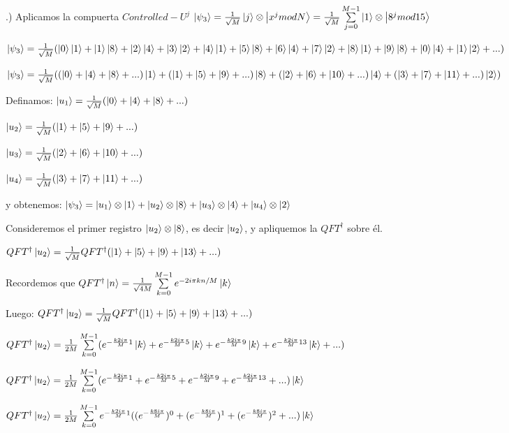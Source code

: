 \documentclass[11pt, spanish]{report}
\begin{document}
.) Aplicamos la compuerta $Controlled-U^j$ $\ket{\psi_3} = \frac{1}{\sqrt{M}} \ket{j} \otimes \ket{x^j mod N} = \frac{1}{\sqrt{M}} \sum\limits_{j=0}^{M-1} \ket{1} \otimes \ket{8^j mod 15}$

$\ket{\psi_3} = \frac{1}{\sqrt{M}} (\ket{0}\ket{1} + \ket{1}\ket{8} + \ket{2}\ket{4} + \ket{3}\ket{2} + \ket{4}\ket{1} + \ket{5}\ket{8} + \ket{6}\ket{4} + \ket{7}\ket{2} + \ket{8}\ket{1} + \ket{9}\ket{8} + \ket{0}\ket{4} + \ket{1}\ket{2} + ...)$

$\ket{\psi_3} = \frac{1}{\sqrt{M}} ((\ket{0} + \ket{4} + \ket{8} + ...)\ket{1} + (\ket{1} + \ket{5} + \ket{9} + ...) \ket{8} + (\ket{2} + \ket{6} + \ket{10} + ...) \ket{4} + (\ket{3} + \ket{7} + \ket{11} + ...) \ket{2})$

Definamos: $\ket{u_1} = \frac{1}{\sqrt{M}} (\ket{0} + \ket{4} + \ket{8} + ...)$

$\ket{u_2} = \frac{1}{\sqrt{M}} (\ket{1} + \ket{5} + \ket{9} + ...)$

$\ket{u_3} = \frac{1}{\sqrt{M}} (\ket{2} + \ket{6} + \ket{10} + ...)$

$\ket{u_4} = \frac{1}{\sqrt{M}} (\ket{3} + \ket{7} + \ket{11} + ...)$

y obtenemos: $\ket{\psi_3} = \ket{u_1} \otimes \ket{1} + \ket{u_2} \otimes \ket{8} + \ket{u_3} \otimes \ket{4} + \ket{u_4} \otimes \ket{2}$

Consideremos el primer registro $\ket{u_2} \otimes \ket{8}$, es decir $\ket{u_2}$, y apliquemos la $QFT^\dagger$ sobre él.

$QFT^\dagger \ket{u_2} = \frac{1}{\sqrt{M}} QFT^\dagger (\ket{1} + \ket{5} + \ket{9} + \ket{13} + ...)$

Recordemos que $QFT^\dagger \ket{n} = \frac{1}{\sqrt{4 M}} \sum\limits_{k=0}^{M-1} e^{-2 i \pi k n /M} \ket{k}$

Luego: $QFT^\dagger \ket{u_2} = \frac{1}{\sqrt{M}} QFT^\dagger (\ket{1} + \ket{5} + \ket{9} + \ket{13} + ...)$

$QFT^\dagger \ket{u_2} = \frac{1}{2M} \sum\limits_{k=0}^{M-1} (e^{- \frac{k 2 i \pi}{M} 1} \ket{k} + e^{- \frac{k 2 i \pi}{M} 5} \ket{k} + e^{- \frac{k 2 i \pi}{M} 9} \ket{k} + e^{- \frac{k 2 i \pi}{M} 13} \ket{k} + ...)$


$QFT^\dagger \ket{u_2} = \frac{1}{2M} \sum\limits_{k=0}^{M-1} (e^{- \frac{k 2 i \pi}{M} 1} + e^{- \frac{k 2 i \pi}{M} 5} + e^{- \frac{k 2 i \pi}{M} 9} + e^{- \frac{k 2 i \pi}{M} 13} + ...) \ket{k}$

$QFT^\dagger \ket{u_2} = \frac{1}{2M} \sum\limits_{k=0}^{M-1} e^{- \frac{k 2 i \pi}{M} 1} ((e^{- \frac{k 8 i \pi}{M}})^0 + (e^{- \frac{k 8 i \pi}{M}})^1 + (e^{- \frac{k 8 i \pi}{M}})^2 + ...) \ket{k}$
\end{document}
